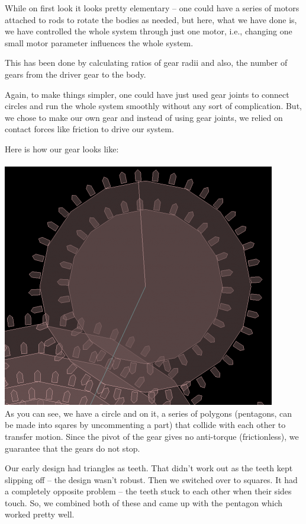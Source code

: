 \documentclass[12pt]{article}
\begin{document}
While on first look it looks pretty elementary -- one could have a series of motors attached to rods to rotate the bodies as needed, but here, what we have done is, we have controlled the whole system through just one motor, i.e., changing one small motor parameter influences the whole system.

This has been done by calculating ratios of gear radii and also, the number of gears from the driver gear to the body.

Again, to make things simpler, one could have just used gear joints to connect circles and run the whole system smoothly without any sort of complication. But, we chose to make our own gear and instead of using gear joints, we relied on contact forces like friction to drive our system.

Here is how our gear looks like:
\\ \\
\includegraphics[scale=0.4]{./img/gear.png}
\\
As you can see, we have a circle and on it, a series of polygons (pentagons, can be made into sqares by uncommenting a part) that collide with each other to transfer motion. Since the pivot of the gear gives no anti-torque (frictionless), we guarantee that the gears do not stop. 

Our early design had triangles as teeth. That didn't work out as the teeth kept slipping off -- the design wasn't robust. Then we switched over to squares. It had a completely opposite problem -- the teeth stuck to each other when their sides touch. So, we combined both of these and came up with the pentagon which worked pretty well.
\pagebreak
\end{document}
